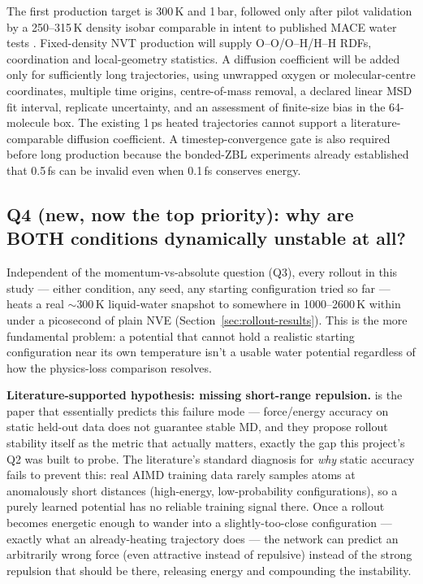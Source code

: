 \documentclass[11pt]{article}
\begin{document}
The first production target is 300\,K and 1\,bar, followed only after pilot
validation by a 250--315\,K density isobar comparable in intent to published
MACE water tests \citep{mace}. Fixed-density NVT production will supply
O--O/O--H/H--H RDFs, coordination and local-geometry statistics. A diffusion
coefficient will be added only for sufficiently long trajectories, using
unwrapped oxygen or molecular-centre coordinates, multiple time origins,
centre-of-mass removal, a declared linear MSD fit interval, replicate
uncertainty, and an assessment of finite-size bias in the 64-molecule box.
The existing 1\,ps heated trajectories cannot support a literature-comparable
diffusion coefficient. A timestep-convergence gate is also required before
long production because the bonded-ZBL experiments already established that
0.5\,fs can be invalid even when 0.1\,fs conserves energy.

\subsection{Q4 (new, now the top priority): why are BOTH conditions
dynamically unstable at all?}
\label{sec:q4}

Independent of the momentum-vs-absolute question (Q3), every rollout in this
study --- either condition, any seed, any starting configuration tried so
far --- heats a real $\sim$300\,K liquid-water snapshot to somewhere in
1000--2600\,K within under a picosecond of plain NVE
(Section~\ref{sec:rollout-results}). This is the more fundamental problem:
a potential that cannot hold a realistic starting configuration near its own
temperature isn't a usable water potential regardless of how the physics-loss
comparison resolves.

\textbf{Literature-supported hypothesis: missing short-range repulsion.}
\citet{fu2022forces} is the paper that essentially predicts this failure
mode --- force/energy accuracy on static held-out data does not guarantee
stable MD, and they propose rollout stability itself as the metric that
actually matters, exactly the gap this project's Q2 was built to probe. The
literature's standard diagnosis for \emph{why} static accuracy fails to
prevent this: real AIMD training data rarely samples atoms at anomalously
short distances (high-energy, low-probability configurations), so a purely
learned potential has no reliable training signal there. Once a rollout
becomes energetic enough to wander into a slightly-too-close configuration
--- exactly what an already-heating trajectory does --- the network can
predict an arbitrarily wrong force (even attractive instead of repulsive)
instead of the strong repulsion that should be there, releasing energy and
compounding the instability.
\end{document}
